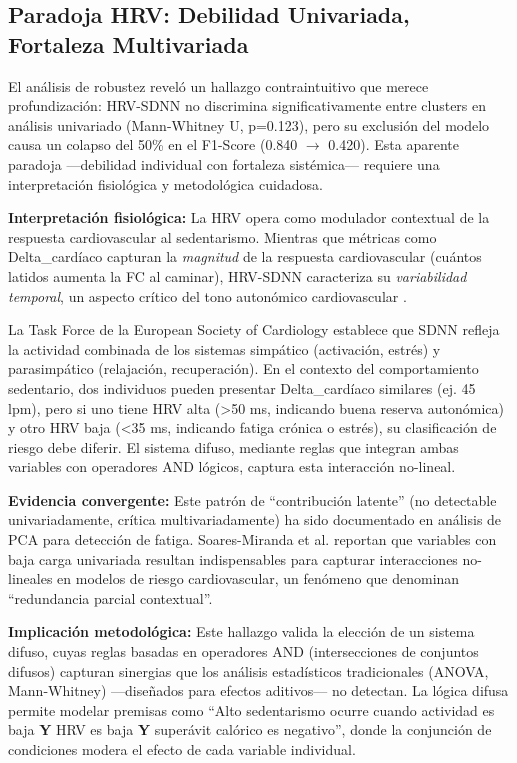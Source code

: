 \subsection{Paradoja HRV: Debilidad Univariada, Fortaleza Multivariada}
\label{subsec:paradoja_hrv}

El análisis de robustez reveló un hallazgo contraintuitivo que merece profundización: HRV-SDNN no discrimina significativamente entre clusters en análisis univariado (Mann-Whitney U, p=0.123), pero su exclusión del modelo causa un colapso del 50\% en el F1-Score (0.840 $\rightarrow$ 0.420). Esta aparente paradoja —debilidad individual con fortaleza sistémica— requiere una interpretación fisiológica y metodológica cuidadosa.

\textbf{Interpretación fisiológica:} La HRV opera como modulador contextual de la respuesta cardiovascular al sedentarismo. Mientras que métricas como Delta\_cardíaco capturan la \textit{magnitud} de la respuesta cardiovascular (cuántos latidos aumenta la FC al caminar), HRV-SDNN caracteriza su \textit{variabilidad temporal}, un aspecto crítico del tono autonómico cardiovascular \cite{TaskForce1996,Laborde2017}.

La Task Force de la European Society of Cardiology \cite{TaskForce1996} establece que SDNN refleja la actividad combinada de los sistemas simpático (activación, estrés) y parasimpático (relajación, recuperación). En el contexto del comportamiento sedentario, dos individuos pueden presentar Delta\_cardíaco similares (ej. 45 lpm), pero si uno tiene HRV alta (>50 ms, indicando buena reserva autonómica) y otro HRV baja (<35 ms, indicando fatiga crónica o estrés), su clasificación de riesgo debe diferir. El sistema difuso, mediante reglas que integran ambas variables con operadores AND lógicos, captura esta interacción no-lineal.

\textbf{Evidencia convergente:} Este patrón de ``contribución latente'' (no detectable univariadamente, crítica multivariadamente) ha sido documentado en análisis de PCA para detección de fatiga. Soares-Miranda et al. \cite{Soares-Miranda2014} reportan que variables con baja carga univariada resultan indispensables para capturar interacciones no-lineales en modelos de riesgo cardiovascular, un fenómeno que denominan ``redundancia parcial contextual''.

\textbf{Implicación metodológica:} Este hallazgo valida la elección de un sistema difuso, cuyas reglas basadas en operadores AND (intersecciones de conjuntos difusos) capturan sinergias que los análisis estadísticos tradicionales (ANOVA, Mann-Whitney) —diseñados para efectos aditivos— no detectan. La lógica difusa permite modelar premisas como ``Alto sedentarismo ocurre cuando actividad es baja \textbf{Y} HRV es baja \textbf{Y} superávit calórico es negativo'', donde la conjunción de condiciones modera el efecto de cada variable individual.

